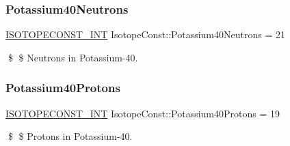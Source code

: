 \subsubsection{\texorpdfstring{Potassium40\+Neutrons}{Potassium40Neutrons}}
{\footnotesize\ttfamily \mbox{\hyperlink{group___isotope_const-_macros_ga5f18360b3e99483a35c32d789e62621c}{I\+S\+O\+T\+O\+P\+E\+C\+O\+N\+S\+T\+\_\+\+I\+NT}} Isotope\+Const\+::\+Potassium40\+Neutrons = 21}

\$ \$ Neutrons in Potassium-\/40. \mbox{\label{group___isotope_const-_potassium-_k40_ga2dbfd84a64986b8ff0d5b1699a1cc73c}} 
\subsubsection{\texorpdfstring{Potassium40\+Protons}{Potassium40Protons}}
{\footnotesize\ttfamily \mbox{\hyperlink{group___isotope_const-_macros_ga5f18360b3e99483a35c32d789e62621c}{I\+S\+O\+T\+O\+P\+E\+C\+O\+N\+S\+T\+\_\+\+I\+NT}} Isotope\+Const\+::\+Potassium40\+Protons = 19}

\$ \$ Protons in Potassium-\/40. 